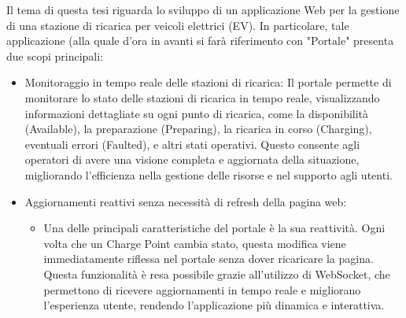 Il tema di questa tesi riguarda lo sviluppo di un applicazione Web per la gestione di una stazione di ricarica per veicoli elettrici (EV). In particolare, tale applicazione (alla quale d'ora in avanti si farà riferimento con "Portale" presenta due scopi principali:
\begin{itemize}
	\item Monitoraggio in tempo reale delle stazioni di ricarica: Il portale permette di monitorare lo 	stato delle stazioni di ricarica in tempo reale, visualizzando informazioni dettagliate su ogni 		punto di ricarica, come la disponibilità (Available), la preparazione (Preparing), la ricarica in 		corso (Charging), eventuali errori (Faulted), e altri stati operativi. Questo consente agli 			operatori di avere una visione completa e aggiornata della situazione, migliorando l'efficienza 		nella gestione delle risorse e nel supporto agli utenti.
	\item Aggiornamenti reattivi senza necessità di refresh della pagina web: 
		\begin{itemize}
		\item Una delle principali caratteristiche del portale è la sua reattività. Ogni volta che un 			Charge Point cambia stato, questa modifica viene immediatamente riflessa nel portale senza 				dover ricaricare la pagina. Questa funzionalità è resa possibile grazie all’utilizzo di 				WebSocket, che permettono di ricevere aggiornamenti in tempo reale e migliorano l’esperienza 			utente, rendendo l’applicazione più dinamica e interattiva.	
	\end{itemize}			 
	 
\end{itemize}